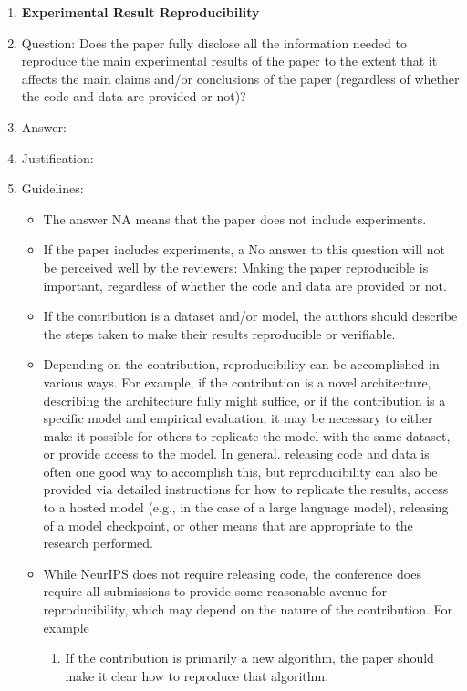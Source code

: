 \documentclass{article} %
\newcounter{ct}
\theoremstyle{definition}
\theoremstyle{remark}
\begin{document}
\begin{enumerate}
    \item {\bf Experimental Result Reproducibility}
    \item[] Question: Does the paper fully disclose all the information needed to reproduce the main experimental results of the paper to the extent that it affects the main claims and/or conclusions of the paper (regardless of whether the code and data are provided or not)?
    \item[] Answer: \answerTODO{} %
    \item[] Justification: \justificationTODO{}
    \item[] Guidelines:
    \begin{itemize}
        \item The answer NA means that the paper does not include experiments.
        \item If the paper includes experiments, a No answer to this question will not be perceived well by the reviewers: Making the paper reproducible is important, regardless of whether the code and data are provided or not.
        \item If the contribution is a dataset and/or model, the authors should describe the steps taken to make their results reproducible or verifiable. 
        \item Depending on the contribution, reproducibility can be accomplished in various ways. For example, if the contribution is a novel architecture, describing the architecture fully might suffice, or if the contribution is a specific model and empirical evaluation, it may be necessary to either make it possible for others to replicate the model with the same dataset, or provide access to the model. In general. releasing code and data is often one good way to accomplish this, but reproducibility can also be provided via detailed instructions for how to replicate the results, access to a hosted model (e.g., in the case of a large language model), releasing of a model checkpoint, or other means that are appropriate to the research performed.
        \item While NeurIPS does not require releasing code, the conference does require all submissions to provide some reasonable avenue for reproducibility, which may depend on the nature of the contribution. For example
        \begin{enumerate}
            \item If the contribution is primarily a new algorithm, the paper should make it clear how to reproduce that algorithm.

\end{enumerate}
\end{itemize}
\end{enumerate}
\end{document}
